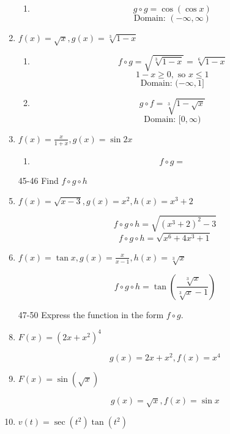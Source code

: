 \documentclass{article}
\begin{document}
\begin{enumerate}
\begin{enumerate}
				\item
				$$g \circ g = \cos(\cos x)$$
				$$\text{Domain: } (-\infty, \infty)$$
			\end{enumerate}

		\item $f(x) = \sqrt{x}, g(x) = \sqrt[3]{1 - x}$

			\begin{enumerate}
				\item
				$$f \circ g = \sqrt{\sqrt[3]{1-x}} = \sqrt[6]{1-x}$$
				$$ 1 - x \geq 0, \text{ so } x \leq 1$$
				$$\text{Domain: } (-\infty, 1]$$

				\item
				$$g \circ f = \sqrt[3]{1 - \sqrt{x}}$$
				$$ \text{Domain: } [0, \infty)$$
			\end{enumerate}
			
		\item $f(x) = \frac{x}{1 + x}, g(x) = \sin 2x$
		
			\begin{enumerate}
			
				\item
				
				$$f \circ g = $$
			\end{enumerate}
			
		\item[45-46] Find $f \circ g \circ h$
		
		\item $f(x) = \sqrt{x - 3}, g(x) = x^2, h(x) = x^3 + 2$
		
			$$f \circ g \circ h = \sqrt{(x^3 + 2)^2 - 3}$$
			$$f \circ g \circ h = \sqrt{x^6 + 4x^3 + 1}$$
			
		\item $f(x) = \tan x, g(x) = \frac{x}{x - 1}, h(x) = \sqrt[3]{x}$
		
			$$f \circ g \circ h = \tan (\frac{\sqrt[3]{x}}{\sqrt[3]{x} - 1})$$
			
		\item[47-50] Express the function in the form $f \circ g$.
		
			\item $F(x) = (2x + x^2)^4$
			
				$$g(x) = 2x + x^2, f(x) = x^4$$
		
			\item $F(x) = \sin( \sqrt{x})$
			
				$$g(x) = \sqrt{x}, f(x) = \sin x$$
				
			\item $v(t) = \sec(t^2)\tan(t^2)$
			

\end{enumerate}
\end{document}
